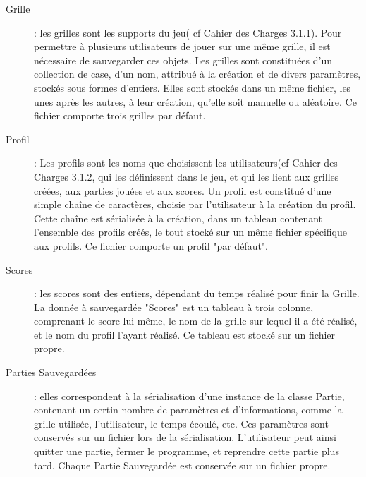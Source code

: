 \documentclass[11pt]{article}
\begin{document}
\begin{description}
    \item [Grille] : les grilles sont les supports du jeu( cf Cahier des Charges 3.1.1). Pour permettre à plusieurs utilisateurs de jouer sur une même grille, il est nécessaire de sauvegarder ces objets. Les grilles sont constituées d'un collection de case, d'un nom, attribué à la création et de divers paramètres, stockés sous formes d'entiers. Elles sont stockés dans un même fichier, les unes après les autres, à leur création, qu'elle soit manuelle ou aléatoire. Ce fichier comporte trois grilles par défaut.
    \item [Profil] : Les profils sont les noms que choisissent les utilisateurs(cf Cahier des Charges 3.1.2, qui les définissent dans le jeu, et qui les lient aux grilles créées, aux parties jouées et aux scores. Un profil est constitué d'une simple chaîne de caractères, choisie par l'utilisateur à la création du profil. Cette chaîne est sérialisée à la création, dans un tableau contenant l'ensemble des profils créés, le tout stocké sur un même fichier spécifique aux profils. Ce fichier comporte un profil "par défaut".
    \item [Scores] : les scores sont des entiers, dépendant du temps réalisé pour finir la Grille. La donnée à sauvegardée "Scores" est un tableau à trois colonne, comprenant le score lui même, le nom de la grille sur lequel il a été réalisé, et le nom du profil l'ayant réalisé. Ce tableau est stocké sur un fichier propre.
    \item [Parties Sauvegardées] : elles correspondent à la sérialisation d'une instance de la classe Partie, contenant un certin nombre de paramètres et d'informations, comme la grille utilisée, l'utilisateur, le temps écoulé, etc. Ces paramètres sont conservés sur un fichier lors de la sérialisation. L'utilisateur peut ainsi quitter une partie, fermer le programme, et reprendre cette partie plus tard. Chaque Partie Sauvegardée est conservée sur un fichier propre.
\end{description}
\end{document}

